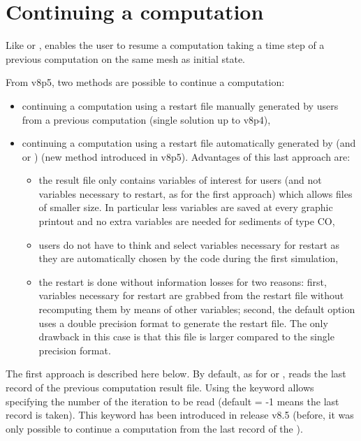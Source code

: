 \section{Continuing a computation}
\label{sec-restart}
Like  or , \gaia enables the user to resume a
computation taking a time step
of a previous computation on the same mesh as initial state.

From v8p5, two methods are possible to continue a computation:
\begin{itemize}
\item continuing a computation using a restart file manually generated
by users from a previous computation (single solution up to v8p4),
\item continuing a computation using a restart file automatically generated
by \gaia (and  or ) (new method introduced in v8p5).
Advantages of this last approach are:
\begin{itemize}
  \item the result file only contains variables of interest for users
(and not variables necessary to restart, as for the first approach) which
allows files of smaller size.
In particular less variables are saved at every graphic printout
and no extra variables are needed for sediments of type CO,
  \item users do not have to think and select variables necessary for restart
as they are automatically chosen by the code during the first simulation,
  \item the restart is done without information losses for two reasons:
first, variables necessary for restart are grabbed from the restart file without
recomputing them by means of other variables;
second, the default option uses a double precision format to generate the
restart file.
The only drawback in this case is that this file is larger compared to the
single precision format.
\end{itemize}
\end{itemize}

The first approach is described here below.
By default, as for  or , \gaia reads the last record of
the previous computation result file.
Using the keyword  allows specifying
the number of the iteration to be read (default = -1 means the last record is
taken).
This keyword has been introduced in release v8.5
(before, it was only possible to continue a computation from the last record
of the ).

